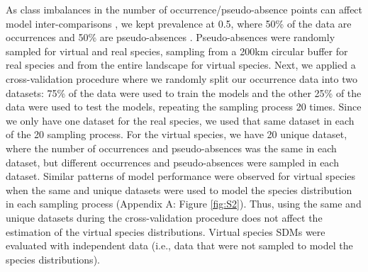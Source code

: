 As class imbalances in the number of occurrence/pseudo-absence points can affect model inter-comparisons \parencite{mcpherson2004, liu2005}, we kept prevalence at 0.5, where 50\% of the data are occurrences and 50\% are pseudo-absences \parencite{senay2013, iturbide2015}. Pseudo-absences were randomly sampled for virtual and real species, sampling from a 200km circular buffer for real species and from the entire landscape for virtual species. Next, we applied a cross-validation procedure where we randomly split our occurrence data into two datasets: 75\% of the data were used to train the models and the other 25\% of the data were used to test the models, repeating the sampling process 20 times. Since we only have one dataset for the real species, we used that same dataset in each of the 20 sampling process. For the virtual species, we have 20 unique dataset, where the number of occurrences and pseudo-absences was the same in each dataset, but different occurrences and pseudo-absences were sampled in each dataset. Similar patterns of model performance were observed for virtual species when the same and unique datasets were used to model the species distribution in each sampling process (Appendix A: Figure \ref{fig:S2}). Thus, using the same and unique datasets during the cross-validation procedure does not affect the estimation of the virtual species distributions. Virtual species SDMs were evaluated with independent data (i.e., data that were not sampled to model the species distributions).

